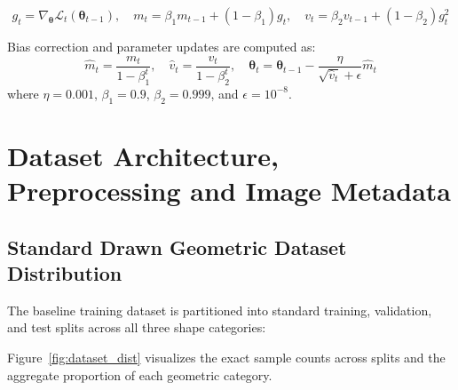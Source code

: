 \documentclass[11pt,a4paper,oneside]{report}
\begin{document}
\begin{equation}
    g_t = \nabla_{\boldsymbol{\theta}} \mathcal{L}_t(\boldsymbol{\theta}_{t-1}), \quad m_t = \beta_1 m_{t-1} + (1 - \beta_1) g_t, \quad v_t = \beta_2 v_{t-1} + (1 - \beta_2) g_t^2
\end{equation}

Bias correction and parameter updates are computed as:
\begin{equation}
    \hat{m}_t = \frac{m_t}{1 - \beta_1^t}, \quad \hat{v}_t = \frac{v_t}{1 - \beta_2^t}, \quad \boldsymbol{\theta}_t = \boldsymbol{\theta}_{t-1} - \frac{\eta}{\sqrt{\hat{v}_t} + \epsilon} \hat{m}_t
\end{equation}
where $\eta = 0.001$, $\beta_1 = 0.9$, $\beta_2 = 0.999$, and $\epsilon = 10^{-8}$.

\chapter{Dataset Architecture, Preprocessing and Image Metadata}

\section{Standard Drawn Geometric Dataset Distribution}
The baseline training dataset is partitioned into standard training, validation, and test splits across all three shape categories:

\begin{table}[H]
\centering
\caption{Standard Dataset Split Summary.}
\end{table}

Figure~\ref{fig:dataset_dist} visualizes the exact sample counts across splits and the aggregate proportion of each geometric category.
\end{document}

